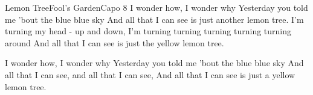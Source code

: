 \begin{song}{Lemon Tree}{Fool's Garden}{Capo 8}
I wonder how, I wonder why
Yesterday you told me 'bout the blue blue sky
And all that I can see is just another lemon tree.
I'm turning my head - up and down,
I'm turning turning turning turning turning around
And all that I can see is just the yellow lemon tree.

I wonder how, I wonder why
Yesterday you told me 'bout the blue blue sky
And all that I can see, and all that I can see,
And all that I can see is just a yellow lemon tree.
\end{song}
